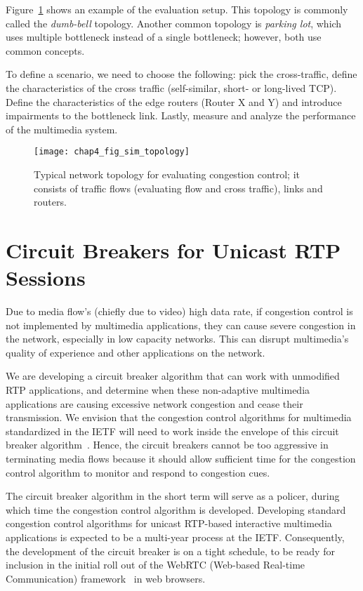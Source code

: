 Figure~\ref{fig:4:topology} shows an example of the evaluation setup. This
topology is commonly called the \emph{dumb-bell} topology. Another common
topology is \emph{parking lot}, which uses multiple bottleneck instead of a
single bottleneck; however, both use common concepts. 


To define a scenario, we need to choose the following: pick the cross-traffic,
define the characteristics of the cross traffic (self-similar, short- or
long-lived TCP). Define the characteristics of the edge routers (Router X and
Y) and introduce impairments to the bottleneck link. Lastly, measure and
analyze the performance of the multimedia system. 


\begin{figure}
\texttt{[image: chap4\_fig\_sim\_topology]}
\caption{Typical network topology for evaluating congestion control; it
consists of traffic flows (evaluating flow and cross traffic), links and
routers.} 
\label{fig:4:topology}
\end{figure}



\section{Circuit Breakers for Unicast RTP Sessions}

Due to media flow's (chiefly due to video) high data rate, if congestion
control is not implemented by multimedia applications, they can cause severe
congestion in the network, especially in low capacity networks. This can
disrupt multimedia's quality of experience and other applications on the
network.

We are developing a circuit breaker algorithm that can work with unmodified
RTP applications, and determine when these non-adaptive multimedia
applications are causing excessive network congestion and cease their
transmission.  We envision that the congestion control algorithms for
multimedia standardized in the IETF will need to work inside the envelope of
this circuit breaker algorithm~\cite{draft.rmcat.evaluate}. Hence, the circuit
breakers cannot be too aggressive in terminating media flows because it
should allow sufficient time for the congestion control algorithm  to monitor
and respond to congestion cues.

The circuit breaker algorithm in the short term will serve as a policer,
during which time the congestion control algorithm is developed. Developing
standard congestion control algorithms for unicast RTP-based interactive
multimedia applications is expected to be a multi-year process at the IETF.
Consequently, the development of the circuit breaker is on a tight schedule,
to be ready for inclusion in the initial roll out of the WebRTC (Web-based
Real-time Communication) framework~\cite{jennings:2013:webrtc} in web
browsers.

